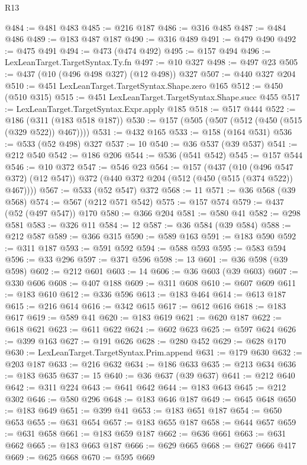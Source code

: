 \begin{lexlean}{R13}
\begin{coremodule}
@484 := @481 @483
@485 := @216 @187
@486 := @316 @485
@487 := @484 @486
@489 := @183 @487 @187
@490 := @316 @489
@491 := @479 @490
@492 := @475 @491
@494 := @473 (@474 @492)
@495 := @157 @494
@496 := LexLeanTarget.TargetSyntax.Ty.fn
@497 := @10 @327
@498 := @497 @23
@505 := @437 (@10 (@496 @498 @327) (@12 @498)) @327
@507 := @440 @327 @204
@510 := @451 LexLeanTarget.TargetSyntax.Shape.zero @165
@512 := @450 (@510 @315)
@515 := @451 LexLeanTarget.TargetSyntax.Shape.succ @455
@517 := LexLeanTarget.TargetSyntax.Expr.apply @185
@518 := @517 @444
@522 := @186 (@311 (@183 @518 @187))
@530 := @157 (@505 (@507 (@512 (@450 (@515 (@329 @522)) @467))))
@531 := @432 @165
@533 := @158 (@164 @531)
@536 := @533 (@52 @498) @327
@537 := 10
@540 := @36 @537 (@39 @537)
@541 := @212 @540
@542 := @186 @206
@544 := @536 (@541 @542)
@545 := @157 @544
@546 := @10 @372
@547 := @546 @23
@564 := @157
    (@437
      (@10 (@496 @547 @372) (@12 @547))
      @372
      (@440 @372 @204 (@512 (@450 (@515 (@374 @522)) @467))))
@567 := @533 (@52 @547) @372
@568 := 11
@571 := @36 @568 (@39 @568)
@574 := @567 (@212 @571 @542)
@575 := @157 @574
@579 := @437 (@52 (@497 @547)) @170
@580 := @366 @204
@581 := @580 @41
@582 := @298 @581
@583 := @326 @11
@584 := 12
@587 := @36 @584 (@39 @584)
@588 := @212 @587
@589 := @366 @315
@590 := @589 @163
@591 := @183 @590
@592 := @311 @187
@593 := @591 @592
@594 := @588 @593
@595 := @583 @594
@596 := @33 @296
@597 := @371 @596
@598 := 13
@601 := @36 @598 (@39 @598)
@602 := @212 @601
@603 := 14
@606 := @36 @603 (@39 @603)
@607 := @330 @606
@608 := @407 @188
@609 := @311 @608
@610 := @607 @609
@611 := @183 @610
@612 := @336 @596
@613 := @183 @464
@614 := @613 @187
@615 := @216 @614
@616 := @342 @615
@617 := @612 @616
@618 := @183 @617
@619 := @589 @41
@620 := @183 @619
@621 := @620 @187
@622 := @618 @621
@623 := @611 @622
@624 := @602 @623
@625 := @597 @624
@626 := @399 @163
@627 := @191 @626
@628 := @280 @452
@629 := @628 @170
@630 := LexLeanTarget.TargetSyntax.Prim.append
@631 := @179 @630
@632 := @203 @187
@633 := @216 @632
@634 := @186 @633
@635 := @213 @634
@636 := @183 @635
@637 := 15
@640 := @36 @637 (@39 @637)
@641 := @212 @640
@642 := @311 @224
@643 := @641 @642
@644 := @183 @643
@645 := @212 @302
@646 := @580 @296
@648 := @183 @646 @187
@649 := @645 @648
@650 := @183 @649
@651 := @399 @41
@653 := @183 @651 @187
@654 := @650 @653
@655 := @631 @654
@657 := @183 @655 @187
@658 := @644 @657
@659 := @631 @658
@661 := @183 @659 @187
@662 := @636 @661
@663 := @631 @662
@665 := @183 @663 @187
@666 := @629 @665
@668 := @627 @666 @417
@669 := @625 @668
@670 := @595 @669

\end{coremodule}
\end{lexlean}
